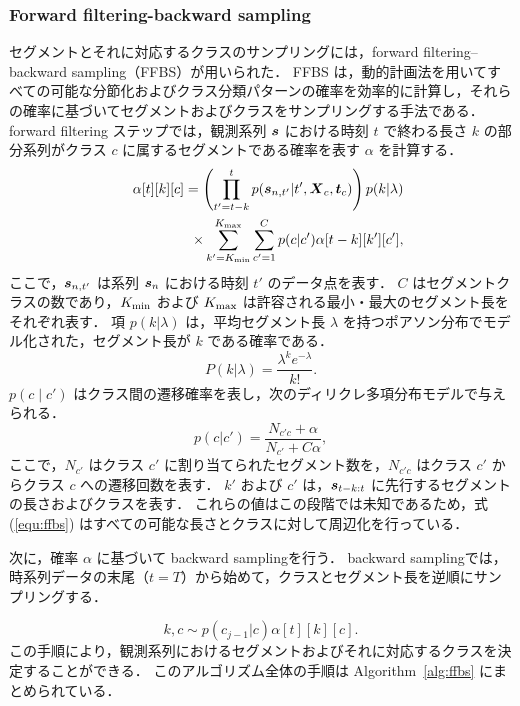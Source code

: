 \documentclass[conference]{IEEEtran}
\begin{document}
\subsubsection{Forward filtering-backward sampling}
セグメントとそれに対応するクラスのサンプリングには，forward filtering–backward sampling（FFBS）が用いられた．  
FFBS は，動的計画法を用いてすべての可能な分節化およびクラス分類パターンの確率を効率的に計算し，それらの確率に基づいてセグメントおよびクラスをサンプリングする手法である．  
forward filtering ステップでは，観測系列 ${ \boldsymbol s}$ における時刻 $t$ で終わる長さ $k$ の部分系列がクラス $c$ に属するセグメントである確率を表す $\alpha$ を計算する．
%
\begin{eqnarray}
\label{equ:ffbs}
&& \alpha[t][k][c] =  \left( \prod_{t'=t-k}^t p(\bs_{n,t'} |t', \bX_{c}, \bt_c)\right) p(k|\lambda) \nonumber \\
&& ~~~~~~~~~~~~\times\sum_{k'=K_{\rm min}}^{K_{\rm max}}\sum_{c'=1}^{C} p(c|c')\alpha[t-k][k'][c'],
\end{eqnarray}
%
ここで，${ \boldsymbol s}_{n,t'}$ は系列 ${ \boldsymbol s}_n$ における時刻 $t'$ のデータ点を表す．  
$C$ はセグメントクラスの数であり，$K_{\rm min}$ および $K_{\rm max}$ は許容される最小・最大のセグメント長をそれぞれ表す．  
項 $p(k|\lambda)$ は，平均セグメント長 $\lambda$ を持つポアソン分布でモデル化された，セグメント長が $k$ である確率である．
%
\begin{equation}
\label{equ:avelen}
P(k|\lambda)=\frac{\lambda^{k}e^{-\lambda}}{k!}.
\end{equation}
%
$p(c \mid c')$ はクラス間の遷移確率を表し，次のディリクレ多項分布モデルで与えられる．
%
\begin{equation}
\label{equ:trans_prob}
p(c|c') = \frac{N_{c'c}+\alpha}{N_{c'}+C\alpha}, 
\end{equation}
%
ここで，$N_{c'}$ はクラス $c'$ に割り当てられたセグメント数を，$N_{c'c}$ はクラス $c'$ からクラス $c$ への遷移回数を表す．  
$k'$ および $c'$ は，${ \boldsymbol s}_{t-k:t}$ に先行するセグメントの長さおよびクラスを表す．  
これらの値はこの段階では未知であるため，式 (\ref{equ:ffbs}) はすべての可能な長さとクラスに対して周辺化を行っている．

次に，確率 $\alpha$ に基づいて backward samplingを行う．  
backward samplingでは，時系列データの末尾（$t = T$）から始めて，クラスとセグメント長を逆順にサンプリングする．

%
\begin{equation}
\label{equ:backward}
k, c \sim p( c_{j-1} | c ) \alpha[t][k][c].
\end{equation}
%
この手順により，観測系列におけるセグメントおよびそれに対応するクラスを決定することができる．  
このアルゴリズム全体の手順は Algorithm~\ref{alg:ffbs} にまとめられている．
\end{document}
